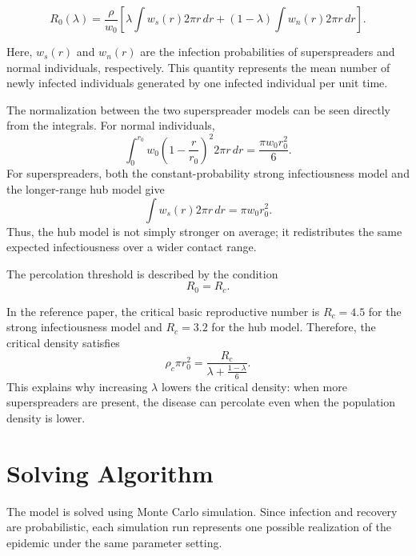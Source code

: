 \documentclass[11pt,a4paper]{article}
\begin{document}
\begin{equation}
R_0(\lambda)
=
\frac{\rho}{w_0}
\left[
\lambda \int w_s(r)2\pi r\,dr
+
(1-\lambda)\int w_n(r)2\pi r\,dr
\right].
\end{equation}

Here, $w_s(r)$ and $w_n(r)$ are the infection probabilities of superspreaders and normal individuals, respectively. This quantity represents the mean number of newly infected individuals generated by one infected individual per unit time.

The normalization between the two superspreader models can be seen directly from the integrals. For normal individuals,
\begin{equation}
    \int_0^{r_0} w_0\left(1-\frac{r}{r_0}\right)^2 2\pi r\,dr
    =
    \frac{\pi w_0 r_0^2}{6}.
\end{equation}
For superspreaders, both the constant-probability strong infectiousness model and the longer-range hub model give
\begin{equation}
    \int w_s(r)2\pi r\,dr = \pi w_0 r_0^2.
\end{equation}
Thus, the hub model is not simply stronger on average; it redistributes the same expected infectiousness over a wider contact range.

The percolation threshold is described by the condition
\begin{equation}
R_0 = R_c.
\end{equation}

In the reference paper, the critical basic reproductive number is $R_c = 4.5$ for the strong infectiousness model and $R_c = 3.2$ for the hub model. 
Therefore, the critical density satisfies
\begin{equation}
\rho_c\pi r_0^2
=
\frac{R_c}
{\lambda + \frac{1-\lambda}{6}}.
\end{equation}
This explains why increasing $\lambda$ lowers the critical density: when more superspreaders are present, the disease can percolate even when the population density is lower.


\section{Solving Algorithm}

The model is solved using Monte Carlo simulation. Since infection and recovery are probabilistic, each simulation run represents one possible realization of the epidemic under the same parameter setting.
\end{document}
